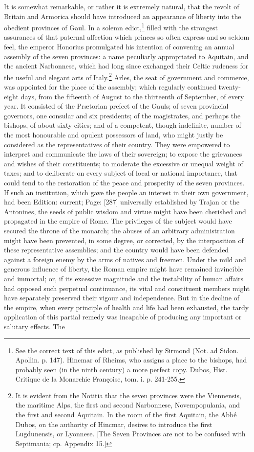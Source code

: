 It is somewhat remarkable, or rather it is extremely natural, that the revolt of Britain and Armorica should have introduced an appearance of liberty into the obedient provinces of Gaul. In a solemn edict,\footnote{See the correct text of this edict, as published by Sirmond (Not. ad Sidon. Apollin. p. 147). Hincmar of Rheims, who assigns a place to the bishops, had probably seen (in the ninth century) a more perfect copy. Dubos, Hist. Critique de la Monarchie Françoise, tom. i. p. 241-255.} filled with the strongest assurances of that paternal affection which princes so often express and so seldom feel, the emperor Honorius promulgated his intention of convening an annual assembly of the seven provinces: a name peculiarly appropriated to Aquitain, and the ancient Narbonnese, which had long since exchanged their Celtic rudeness for the useful and elegant arts of Italy.\footnote{It is evident from the Notitia that the seven provinces were the Viennensis, the maritime Alps, the first and second Narbonnese, Novempopulania, and the first and second Aquitain. In the room of the first Aquitain, the Abbé Dubos, on the authority of Hincmar, desires to introduce the first Lugdunensis, or Lyonnese. [The Seven Provinces are not to be confused with Septimania; cp. Appendix 15.]} Arles, the seat of government and commerce, was appointed for the place of the assembly; which regularly continued twenty-eight days, from the fifteenth of August to the thirteenth of September, of every year. It consisted of the Prætorian prefect of the Gauls; of seven provincial governors, one consular and six presidents; of the magistrates, and perhaps the bishops, of about sixty cities; and of a competent, though indefinite, number of the most honourable and opulent possessors of land, who might justly be considered as the representatives of their country. They were empowered to interpret and communicate the laws of their sovereign; to expose the grievances and wishes of their constituents; to moderate the excessive or unequal weight of taxes; and to deliberate on every subject of local or national importance, that could tend to the restoration of the peace and prosperity of the seven provinces. If such an institution, which gave the people an interest in their own government, had been Edition: current; Page: [287] universally established by Trajan or the Antonines, the seeds of public wisdom and virtue might have been cherished and propagated in the empire of Rome. The privileges of the subject would have secured the throne of the monarch; the abuses of an arbitrary administration might have been prevented, in some degree, or corrected, by the interposition of these representative assemblies; and the country would have been defended against a foreign enemy by the arms of natives and freemen. Under the mild and generous influence of liberty, the Roman empire might have remained invincible and immortal; or, if its excessive magnitude and the instability of human affairs had opposed such perpetual continuance, its vital and constituent members might have separately preserved their vigour and independence. But in the decline of the empire, when every principle of health and life had been exhausted, the tardy application of this partial remedy was incapable of producing any important or salutary effects. The 